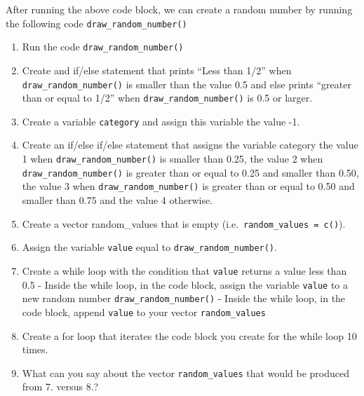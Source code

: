 After running the above code block, we can create a random number by
running the following code \texttt{draw\_random\_number()} 
\begin{enumerate}
    \item Run the code \texttt{draw\_random\_number()}
    \item Create and if/else statement that prints ``Less than 1/2'' when \texttt{draw\_random\_number()} is smaller than the value 0.5 and else prints ``greater than or equal to 1/2'' when \texttt{draw\_random\_number()} is 0.5 or larger.
    \item  Create a variable \texttt{category} and assign this variable the value -1.
    \item Create an if/else if/else statement that assigns the variable category the value 1 when \texttt{draw\_random\_number()} is smaller than 0.25, the value 2 when \texttt{draw\_random\_number()} is greater than or equal to 0.25 and smaller than 0.50, the value 3 when \texttt{draw\_random\_number()} is greater than or equal to 0.50 and smaller than 0.75 and the value 4 otherwise.
    \item  Create a vector random\_values that is empty (i.e.~\texttt{random\_values\ =\ c()}).
    \item  Assign the variable \texttt{value} equal to \texttt{draw\_random\_number()}.
    \item Create a while loop with the condition that \texttt{value} returns a value less than 0.5 - Inside the while loop, in the code block, assign the variable \texttt{value} to a new random number \texttt{draw\_random\_number()} - Inside the while
loop, in the code block, append \texttt{value} to your vector
\texttt{random\_values} 
    \item Create a for loop that iterates the code block you create for the while loop 10 times.
    \item  What can you say about the vector \texttt{random\_values} that would be produced from 7. versus 8.?
\end{enumerate}


